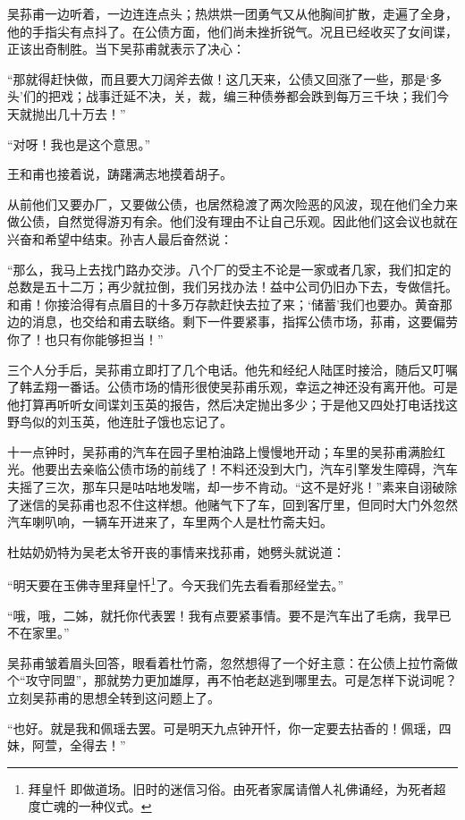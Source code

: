 \par 吴荪甫一边听着，一边连连点头；热烘烘一团勇气又从他胸间扩散，走遍了全身，他的手指尖有点抖了。在公债方面，他们尚未挫折锐气。况且已经收买了女间谍，正该出奇制胜。当下吴荪甫就表示了决心：
\par “那就得赶快做，而且要大刀阔斧去做！这几天来，公债又回涨了一些，那是‘多头’们的把戏；战事迁延不决，关，裁，编三种债券都会跌到每万三千块；我们今天就抛出几十万去！”
\par “对呀！我也是这个意思。”
\par 王和甫也接着说，踌躇满志地摸着胡子。
\par 从前他们又要办厂，又要做公债，也居然稳渡了两次险恶的风波，现在他们全力来做公债，自然觉得游刃有余。他们没有理由不让自己乐观。因此他们这会议也就在兴奋和希望中结束。孙吉人最后奋然说：
\par “那么，我马上去找门路办交涉。八个厂的受主不论是一家或者几家，我们扣定的总数是五十二万；再少就拉倒，我们另找办法！益中公司仍旧办下去，专做信托。和甫！你接洽得有点眉目的十多万存款赶快去拉了来；‘储蓄’我们也要办。黄奋那边的消息，也交给和甫去联络。剩下一件要紧事，指挥公债市场，荪甫，这要偏劳你了！也只有你能够担当！”
\par 三个人分手后，吴荪甫立即打了几个电话。他先和经纪人陆匡时接洽，随后又叮嘱了韩孟翔一番话。公债市场的情形很使吴荪甫乐观，幸运之神还没有离开他。可是他打算再听听女间谍刘玉英的报告，然后决定抛出多少；于是他又四处打电话找这野鸟似的刘玉英，他连肚子饿也忘记了。
\par 十一点钟时，吴荪甫的汽车在园子里柏油路上慢慢地开动；车里的吴荪甫满脸红光。他要出去亲临公债市场的前线了！不料还没到大门，汽车引擎发生障碍，汽车夫摇了三次，那车只是咕咕地发喘，却一步不肯动。“这不是好兆！”素来自诩破除了迷信的吴荪甫也忍不住这样想。他赌气下了车，回到客厅里，但同时大门外忽然汽车喇叭响，一辆车开进来了，车里两个人是杜竹斋夫妇。
\par 杜姑奶奶特为吴老太爷开丧的事情来找荪甫，她劈头就说道：
\par “明天要在玉佛寺里拜皇忏\footnote{拜皇忏 即做道场。旧时的迷信习俗。由死者家属请僧人礼佛诵经，为死者超度亡魂的一种仪式。}了。今天我们先去看看那经堂去。”
\par “哦，哦，二姊，就托你代表罢！我有点要紧事情。要不是汽车出了毛病，我早已不在家里。”
\par 吴荪甫皱着眉头回答，眼看着杜竹斋，忽然想得了一个好主意：在公债上拉竹斋做个“攻守同盟”，那就势力更加雄厚，再不怕老赵逃到哪里去。可是怎样下说词呢？立刻吴荪甫的思想全转到这问题上了。
\par “也好。就是我和佩瑶去罢。可是明天九点钟开忏，你一定要去拈香的！佩瑶，四妹，阿萱，全得去！”
